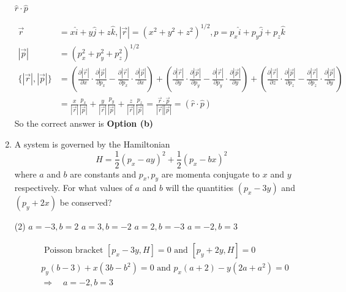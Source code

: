 \begin{enumerate}
\begin{tasks}
	\task[\textbf{b.}] $\hat{r} \cdot \hat{p}$
\end{tasks}
\begin{answer}
	$$
	\begin{aligned}
	\vec{r}&=x \hat{i}+y \hat{j}+z \hat{k},|\vec{r}|=\left(x^{2}+y^{2}+z^{2}\right)^{1 / 2}, p=p_{x} \hat{i}+p_{y} \hat{j}+p_{z} \hat{k}\\
	|\vec{p}|&=\left(p_{x}^{2}+p_{y}^{2}+p_{z}^{2}\right)^{1 / 2}\\
	\{|\vec{r}|,|\vec{p}|\}&=\left(\frac{\partial|\vec{r}|}{\partial x} \cdot \frac{\partial|\vec{p}|}{\partial p_{x}}-\frac{\partial|\vec{r}|}{\partial p_{x}} \cdot \frac{\partial|\vec{p}|}{\partial x}\right)+\left(\frac{\partial|\vec{r}|}{\partial y} \cdot \frac{\partial|\vec{p}|}{\partial p_{y}}-\frac{\partial|\vec{r}|}{\partial p_{y}} \cdot \frac{\partial|\vec{p}|}{\partial y}\right)+\left(\frac{\partial|\vec{r}|}{\partial z} \cdot \frac{\partial|\vec{p}|}{\partial p_{z}}-\frac{\partial|\vec{r}|}{\partial p_{z}} \cdot \frac{\partial|\vec{p}|}{\partial y}\right)\\
	&=\frac{x}{|\vec{r}|} \frac{p_{x}}{|\vec{p}|}+\frac{y}{|\vec{r}|} \frac{p_{y}}{|\vec{p}|}+\frac{z}{|\vec{r}|} \frac{p_{z}}{|\vec{p}|}=\frac{\vec{r} \cdot \vec{p}}{|\vec{r}||\vec{p}|}=(\hat{r} \cdot \hat{p})
\end{aligned}
$$
So the correct answer is \textbf{Option (b)}
\end{answer}
\item A system is governed by the Hamiltonian
$$
H=\frac{1}{2}\left(p_{x}-a y\right)^{2}+\frac{1}{2}\left(p_{x}-b x\right)^{2}
$$
where $a$ and $b$ are constants and $p_{x}, p_{y}$ are momenta conjugate to $x$ and $y$ respectively.
For what values of $a$ and $b$ will the quantities $\left(p_{x}-3 y\right)$ and $\left(p_{y}+2 x\right)$ be conserved?
{}
 \begin{tasks}(2)
	\task[\textbf{a.}]$a=-3, b=2$
	\task[\textbf{b.}]$a=3, b=-2$
	\task[\textbf{c.}]$a=2, b=-3$
	\task[\textbf{d.}] $a=-2, b=3$
\end{tasks}
\begin{answer}
	$$
	\begin{aligned}
	&\text { Poisson bracket }\left[p_{x}-3 y, H\right]=0 \text { and }\left[p_{y}+2 y, H\right]=0\\
	&p_{y}(b-3)+x\left(3 b-b^{2}\right)=0 \text { and } p_{x}(a+2)-y\left(2 a+a^{2}\right)=0\\
	&\Rightarrow \quad a=-2, b=3
\end{aligned}
$$
\end{answer}
\end{enumerate}
